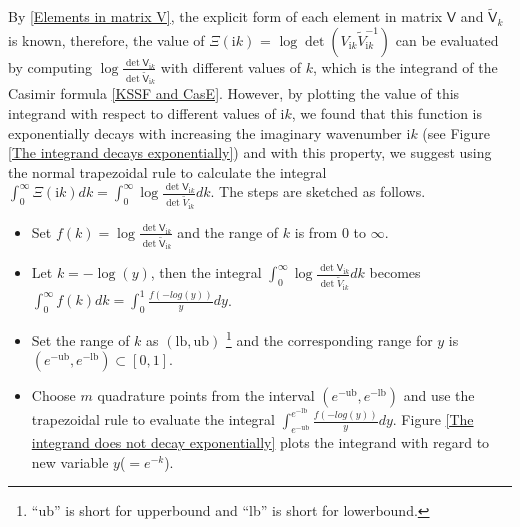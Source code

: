By \eqref{Elements in matrix V}, the explicit form of each element in matrix $\mathsf{V}$ and $\tilde{\mathsf{V}}_{k}$ is known, therefore,
the value of $\Xi(\mathrm{i}k)$ = $\log\det(V_{\mathrm{i}k}\tilde{V}_{\mathrm{i}k}^{-1})$ can be evaluated by computing 
$\log\frac{\det\mathsf{V}_{\mathrm{i}k}}{\det\tilde{\mathsf{V}}_{\mathrm{i}k}}$ with 
different values of $k$, which is the integrand of the Casimir formula \eqref{KSSF and CasE}. However, by plotting the value of this integrand 
with respect to different values of $\mathrm{i}k$, we found that this function is exponentially decays with increasing the imaginary wavenumber 
$\mathrm{i}k$ (see Figure \ref{The integrand decays exponentially}) and with this property, we suggest using the normal trapezoidal rule to calculate the integral 
$\int_{0}^{\infty}\Xi(\mathrm{i}k)dk = \int_{0}^{\infty}\log\frac{\det\mathsf{V}_{\mathrm{i}k}}{\det\tilde{V}_{\mathrm{i}k}}dk$. The steps are sketched as follows.

\begin{itemize}
    \item Set $f(k) = \log\frac{\det\mathsf{V}_{\mathrm{i}k}}{\det\tilde{\mathsf{V}}_{\mathrm{i}k}}$ and the range of $k$ is from 0 to $\infty$.
    \item Let $k = -\log(y)$, then the integral $\int_{0}^{\infty}\log\frac{\det\mathsf{V}_{\mathrm{i}k}}{\det\tilde{V}_{\mathrm{i}k}}dk$ becomes 
    $\int_{0}^{\infty}f(k)dk = \int_{0}^{1}\frac{f(-log(y))}{y}dy$.
    \item Set the range of $k$ as $(\text{lb}, \text{ub})$ \footnote{``ub'' is short for upperbound and ``lb'' is short for lowerbound.} and the corresponding 
    range for $y$ is $(e^{-\text{ub}}, e^{-\text{lb}})\subset[0,1]$.
    \item Choose $m$ quadrature points from the interval $(e^{-\text{ub}}, e^{-\text{lb}})$ and use the trapezoidal rule to evaluate the integral 
    $\int_{e^{-\text{ub}}}^{e^{-\text{lb}}}\frac{f(-log(y))}{y}dy$. Figure \ref{The integrand does not decay exponentially} plots the integrand with regard to new 
    variable $y$($= e^{-k}$).

\end{itemize}


